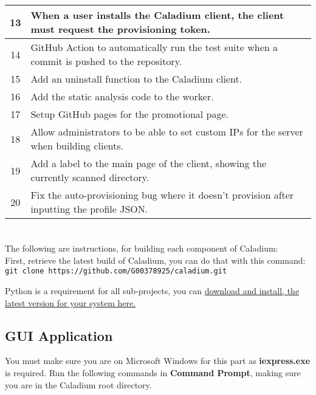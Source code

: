 \begin{appendices}
\begin{table}[ht]
\begin{tabular}{|c|p{14cm}|}
        \hline
        13 & When a user installs the Caladium client,
        the client must request the provisioning token. \\
        \hline
        14 & GitHub Action to automatically run the test suite
        when a commit is pushed to the repository. \\
        \hline
        15 & Add an uninstall function to the Caladium client. \\
        \hline
        16 & Add the static analysis code to the worker. \\
        \hline
        17 & Setup GitHub pages for the promotional page. \\
        \hline
        18 & Allow administrators to be able to set custom IPs
        for the server when building clients. \\
        \hline
        19 & Add a label to the main page of the client,
        showing the currently scanned directory. \\
        \hline
        20 & Fix the auto-provisioning bug where it doesn't
        provision after inputting the profile JSON. \\
        \hline
    \end{tabular}
    \label{table:kanbanBoard}
\end{table}

\renewcommand{\chaptername}{Appendix C}
\renewcommand{\thechapter}{C}
\chapter{}
\label{appendix:c}

The following are instructions,
for building each component of Caladium: \\
First, retrieve the latest build of Caladium, you can do that with this command:
\texttt{git clone https://github.com/G00378925/caladium.git}

Python is a requirement for all sub-projects, you can
\href{https://www.python.org/downloads/}{download and install, the latest version for your system here.}

\section{GUI Application}
You must make sure you are on Microsoft Windows
for this part as \textbf{iexpress.exe} is required.
Run the following commands in \textbf{Command Prompt},
making sure you are in the Caladium root directory.


\end{appendices}
